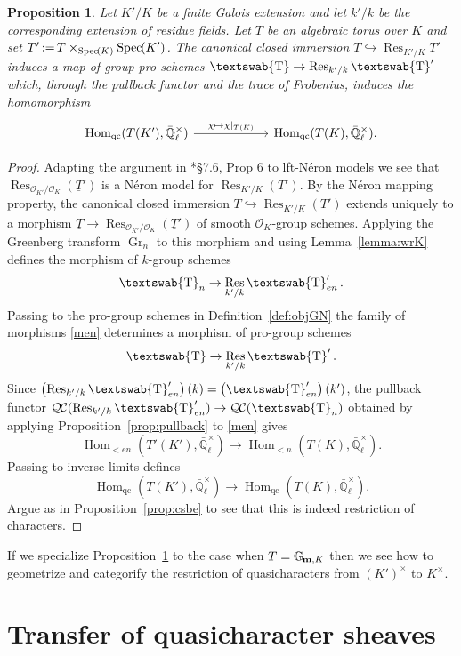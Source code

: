 \documentclass[11pt]{amsart}
\newcommand{\mathswab}[1]{\operatorname{\textswab{#1}}}
\theoremstyle{plain}
\newtheorem{proposition}[theorem]{Proposition}
\theoremstyle{definition}
\theoremstyle{remark}
\newcommand{\Spec}[1]{{\operatorname{Spec}\hskip-1pt( #1 )}}
\newcommand{\EE}{\mathbb{\bar Q}_\ell}
\newcommand{\OK}{\mathcal{O}_K}
\newcommand{\OKp}{\mathcal{O}_{K'}}
\newcommand{\Fq}{k}
\newcommand{\EEx}{\EE^\times}
\DeclareMathOperator{\Hom}{Hom}
\DeclareMathOperator{\Gr}{Gr}
\DeclareMathOperator{\Res}{Res}
\newcommand{\ceq}{{\, :=\, }}
\newcommand{\Gm}[1]{\mathbb{G}_{\hskip-1pt\textbf{m},#1}}
\newcommand{\GN}[1]{\mathswab{#1}}
\newcommand{\TTp}{\underline{T}'}
\newcommand{\QC}{{\mathcal{Q\hskip-0.8pt C}}}
\begin{document}
\begin{proposition}\label{prop:wrK}
Let $K'/K$ be a finite Galois extension and
let $k'/k$ be the corresponding extension of residue fields.
Let $T$ be an algebraic torus over $K$ and 
set $T' \ceq T \times_\Spec{K} \Spec{K'}$.
The canonical closed immersion $T \hookrightarrow \Res_{K'/K} T'$
induces a map of group pro-schemes $\GN{T} \to \Res_{k'/k} \GN{T}'$ which,
through the pullback functor and the trace of Frobenius, induces the homomorphism
\[
\begin{tikzcd}[column sep=60]
\Hom_{\text{qc}}(T(K'), \EEx) \arrow{r}{\chi \mapsto \chi\vert_{T(K)}} &\Hom_{\text{qc}}(T(K), \EEx).
\end{tikzcd}
\]  
\end{proposition}

\begin{proof}
Adapting the argument in \cite{bosch-lutkebohmert-reynaud:NeronModels}*{\S 7.6, Prop 6} to lft-Néron models
we see that $\Res_{\OKp/\OK}(\TTp)$ is a Néron model for $\Res_{K'/K}(T')$.
By the Néron mapping property, the canonical closed immersion
$T\hookrightarrow \Res_{K'/K}(T')$ extends uniquely to a morphism
$\underline{T}\to \Res_{\OKp/\OK}(\TTp)$ of smooth $\OK$-group schemes.
Applying the Greenberg transform $\Gr_{n}$ to this morphism
and using Lemma~\ref{lemma:wrK} defines the morphism of $\Fq$-group schemes
\begin{equation}\label{men}
\GN{T}_n \to \Res_{k'/k} \GN{T}'_{en}.
\end{equation}
Passing to the pro-group schemes in Definition~\ref{def:objGN} 
the family of morphisms \eqref{men} determines a morphism of pro-group schemes
\[
\GN{T} \to \Res_{k'/k} \GN{T}'.
\]
Since $\left(\Res_{k'/k} \GN{T}'_{en} \right)(\Fq) = \left(\GN{T}'_{en}\right)(k')$,
the pullback functor $\QC(\Res_{k'/k} \GN{T}'_{en})\to \QC(\GN{T}_n)$
obtained by applying Proposition~\ref{prop:pullback} to \eqref{men} gives
\[
\Hom_{< en}(T'(K'),\EEx) \to \Hom_{< n}(T(K),\EEx).
\]
Passing to inverse limits defines
\[
\Hom_{\text{qc}}(T(K'),\EEx) \to \Hom_{\text{qc}}(T(K),\EEx).
\]
Argue as in Proposition~\ref{prop:csbe} to see that this is indeed restriction of characters.
\end{proof}

If we specialize Proposition~\ref{prop:wrK} to the case when 
$T = \Gm{K}$ then we see how to geometrize and categorify the restriction of quasicharacters from $(K')^\times$ to $K^\times$.


\section{Transfer of quasicharacter sheaves} \label{sec:transfer}
\end{document}
